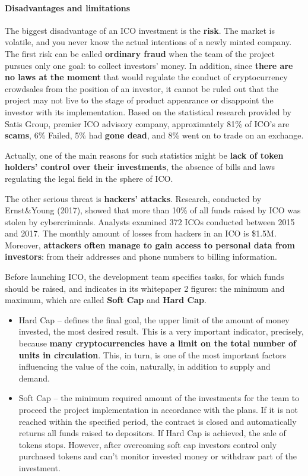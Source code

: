 \paragraph{Disadvantages and limitations}
The biggest disadvantage of an ICO investment is the \textbf{risk}. The market is volatile, and you never know the actual intentions of a newly minted company. The first risk can be called \textbf{ordinary fraud} when the team of the project pursues only one goal: to collect investors' money.
In addition, since \textbf{there are no laws at the moment} that would regulate the conduct of cryptocurrency crowdsales from the position of an investor, it cannot be ruled out that the project may not live to the stage of product appearance or disappoint the investor with its implementation.
Based on the statistical research provided by Satis Group, premier ICO advisory company, approximately 81\% of ICO's are \textbf{scams}, 6\% Failed, 5\% had \textbf{gone dead}, and 8\% went on to trade on an exchange.

Actually, one of the main reasons for such statistics might be \textbf{lack of token holders' control over their investments}, the absence of bills and laws regulating the legal field in the sphere of ICO.

The other serious threat is \textbf{hackers' attacks}. Research, conducted by Ernst\&Young (2017), showed that more than 10\% of all funds raised by ICO was stolen by cybercriminals. Analysts examined 372 ICOs conducted between 2015 and 2017. The monthly amount of losses from hackers in an ICO is \$1.5M. Moreover, \textbf{attackers often manage to gain access to personal data from investors}: from their addresses and phone numbers to billing information.

Before launching ICO, the development team specifies tasks, for which funds should be raised, and indicates in its whitepaper 2 figures: the minimum and maximum, which are called \textbf{Soft Cap} and \textbf{Hard Cap}.

\begin{itemize}
    \item Hard Cap -- defines the final goal, the upper limit of the amount of money invested, the most desired result. This is a very important indicator, precisely, because \textbf{many cryptocurrencies have a limit on the total number of units in circulation}. This, in turn, is one of the most important factors influencing the value of the coin, naturally, in addition to supply and demand.
    \item Soft Cap -- the minimum required amount of the investments for the team to proceed the project implementation in accordance with the plans. If it is not reached within the specified period, the contract is closed and automatically returns all funds raised to depositors. If Hard Cap is achieved, the sale of tokens stops. However, after overcoming soft cap investors control only purchased tokens and can't monitor invested money or withdraw part of the investment.
\end{itemize}

